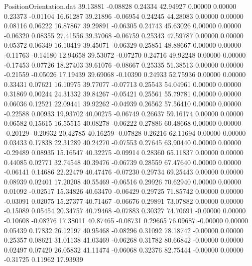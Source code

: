 \begin{filecontents}{PositionOrientation.dat}
  39.13881   -0.08828    0.24334    42.94927    0.00000    0.00000    0.23373   -0.01104   16.61287
  39.21896   -0.06954    0.24245    44.28083    0.00000    0.00000    0.08116    0.06222   16.87867
  39.29891   -0.06305    0.24743    45.63026    0.00000    0.00000   -0.06320    0.08355   27.41556
  39.37068   -0.06759    0.25343    47.59787    0.00000    0.00000    0.05372    0.06349   16.10419
  39.45071   -0.06329    0.25851    48.88667    0.00000    0.00000   -0.11763   -0.14180   12.94658
  39.53072   -0.07270    0.24716    49.92248    0.00000    0.00000   -0.17453    0.07726   18.27403
  39.61076   -0.08667    0.25335    51.38513    0.00000    0.00000   -0.21559   -0.05026   17.19439
  39.69068   -0.10390    0.24933    52.75936    0.00000    0.00000    0.33431    0.07621   16.10975
  39.77077   -0.07713    0.25543    54.04961    0.00000    0.00000    0.31869    0.00244   24.31332
  39.84267   -0.05421    0.25561    55.79781    0.00000    0.00000    0.06036    0.12521   22.09441
  39.92262   -0.04939    0.26562    57.56410    0.00000    0.00000   -0.22588    0.00933   19.93702
  40.00275   -0.06749    0.26637    59.16174    0.00000    0.00000    0.06582    0.15615   16.55515
  40.08278   -0.06222    0.27886    60.48668    0.00000    0.00000   -0.20129   -0.20932   20.42785
  40.16259   -0.07828    0.26216    62.11694    0.00000    0.00000    0.03433    0.17838   22.31289
  40.24270   -0.07553    0.27645    63.90440    0.00000    0.00000   -0.29489    0.08935   15.16547
  40.32275   -0.09914    0.28360    65.11837    0.00000    0.00000    0.44085    0.02771   32.74548
  40.39476   -0.06739    0.28559    67.47640    0.00000    0.00000   -0.06141    0.14686   22.22479
  40.47476   -0.07230    0.29734    69.25443    0.00000    0.00000    0.08939    0.02401   17.20208
  40.55469   -0.06516    0.29926    70.62940    0.00000    0.00000    0.01092   -0.02517   15.34826
  40.63470   -0.06429    0.29725    71.85742    0.00000    0.00000   -0.03091    0.02075   15.27377
  40.71467   -0.06676    0.29891    73.07882    0.00000    0.00000   -0.15089    0.05454   20.34757
  40.79468   -0.07883    0.30327    74.70691   -0.00000    0.00000   -0.10608   -0.08276   17.38011
  40.87465   -0.08731    0.29665    76.09687   -0.00000    0.00000    0.05439    0.17832   26.12197
  40.95468   -0.08296    0.31092    78.18742   -0.00000    0.00000    0.25357    0.08621   31.01138
  41.03469   -0.06268    0.31782    80.66842   -0.00000    0.00000    0.02497    0.07420   26.05832
  41.11474   -0.06068    0.32376    82.75444   -0.00000    0.00000   -0.31725    0.11962   17.93939

\end{filecontents}
